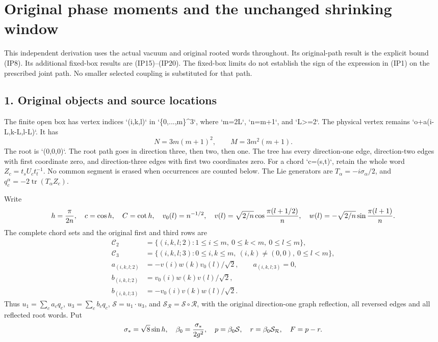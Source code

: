 \documentclass[11pt]{article}
\begin{document}
\section*{Original phase moments and the unchanged shrinking window}

This independent derivation uses the actual vacuum and original rooted
words throughout. Its original-path result is the explicit bound (IP8).
Its additional fixed-box results are (IP15)–(IP20). The fixed-box limits
do not establish the sign of the expression in (IP1) on the prescribed
joint path. No smaller selected coupling is substituted for that path.

\subsection*{1. Original objects and source locations}

The finite open box has vertex indices `(i,k,l)` in `\{0,...,m\}\textasciicircum{}3`, where
`m=2L`, `n=m+1`, and `L>=2`. The physical vertex remains
`o+a(i-L,k-L,l-L)`. It has
\[
 N=3m(m+1)^2,\qquad M=3m^2(m+1).
\]
The root is `(0,0,0)`. The root path goes in direction three, then two,
then one. The tree has every direction-one edge, direction-two edges
with first coordinate zero, and direction-three edges with first two
coordinates zero. For a chord `c=(s,t)`, retain the whole word
\(Z_c=t_sU_ct_t^{-1}\). No common segment is erased when occurrences
are counted below. The Lie generators are
\(T_\alpha=-i\sigma_\alpha/2\), and
\(q_c^\alpha=-2\operatorname{tr}(T_\alpha Z_c)\).

Write
\[
 h={\pi\over2n},\quad c=\cos h,\quad C=\cot h,\quad
 v_0(l)=n^{-1/2},\quad
 v(l)=\sqrt{2/n}\cos{\pi(l+1/2)\over n},\quad
 w(l)=-\sqrt{2/n}\sin{\pi(l+1)\over n}.
\]
The complete chord sets and the original first and third rows are
\[
\begin{aligned}
\mathcal C_2&=\{(i,k,l;2):1\le i\le m,\ 0\le k<m,\ 0\le l\le m\},\\
\mathcal C_3&=\{(i,k,l;3):0\le i,k\le m,\ (i,k)\ne(0,0),\ 0\le l<m\},\\
a_{(i,k,l;2)}&=-v(i)w(k)v_0(l)/\sqrt2,\qquad a_{(i,k,l;3)}=0,\\
b_{(i,k,l;2)}&=v_0(i)w(k)v(l)/\sqrt2,\\
b_{(i,k,l;3)}&=-v_0(i)v(k)w(l)/\sqrt2.
\end{aligned}
\]
Thus \(u_1=\sum_ca_cq_c\), \(u_3=\sum_cb_cq_c\),
\(\mathcal S=u_1\cdot u_3\), and
\(\mathcal S_{\mathcal R}=\mathcal S\circ\mathcal R\), with the
original direction-one graph reflection, all reversed edges and all
reflected root words. Put
\[
\sigma_*=\sqrt8\sin h,\quad \beta_0={\sigma_*\over2g^2},\quad
p=\beta_0\mathcal S,\quad r=\beta_0\mathcal S_{\mathcal R},\quad
F=p-r.
\]
\end{document}
